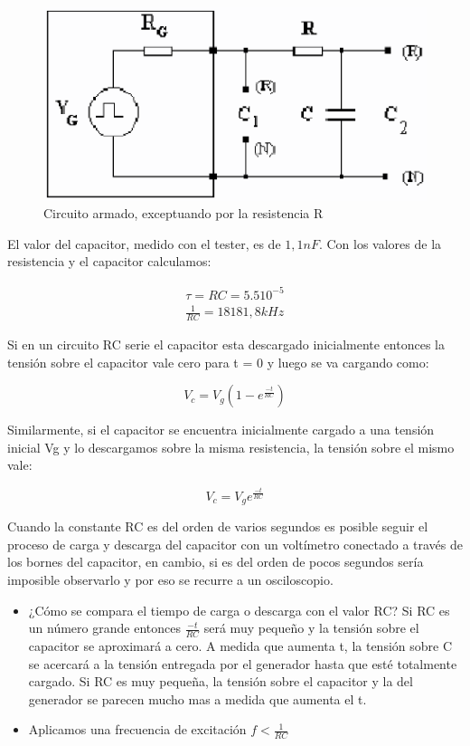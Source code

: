 \documentclass{article}
\begin{document}
\begin{figure}
\centering
\includegraphics[width=\columnwidth]{experiencia_capacitor}
\caption{Circuito armado, exceptuando por la resistencia R}
\end{figure}

El valor del capacitor, medido con el tester, es de $1,1 nF$. Con los valores de la resistencia y el capacitor calculamos:

\begin{align*}
\tau = RC = 5.5 10^{-5} \\
\frac{1}{RC}  = 18181,8 kHz
\end{align*}

Si en un circuito RC serie el capacitor esta descargado inicialmente entonces la tensión sobre el capacitor vale cero para t = 0 y luego se va cargando como: 

\begin{equation}
V_c = V_g(1-e^{\frac{-t}{RC}})
\end{equation}

Similarmente, si el capacitor se encuentra inicialmente cargado a una tensión inicial Vg y lo descargamos sobre la misma resistencia, la tensión sobre el mismo vale: 

\begin{equation}
V_c = V_g e^{\frac{-t}{RC}}
\end{equation}

Cuando la constante RC es del orden de varios segundos es posible seguir el proceso de carga y descarga del capacitor con un voltímetro conectado a través de los bornes del capacitor, en cambio, si es del orden de pocos segundos sería imposible observarlo y por eso se recurre a un osciloscopio. 

\begin{itemize}
\item ¿Cómo se compara el tiempo de carga o descarga con el valor RC? Si RC es un número grande entonces $\frac{-t}{RC}$ será muy pequeño y la tensión sobre el capacitor se aproximará a cero. A medida que aumenta t, la tensión sobre C se acercará a la tensión entregada por el generador hasta que esté totalmente cargado. Si RC es muy pequeña, la tensión sobre el capacitor y la del generador se parecen mucho mas a medida que aumenta el t. 
\item Aplicamos una frecuencia de excitación $f < \frac{1}{RC}$ 
\end{itemize}
\end{document}
